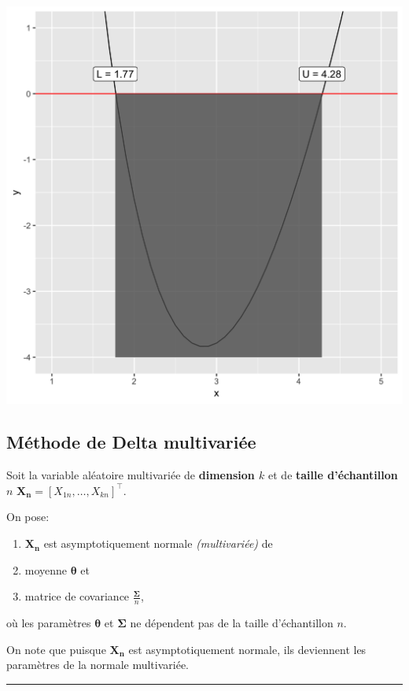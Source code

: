 \documentclass[10pt, french]{article}
\begin{document}
\begin{multicols*}{3}
\begin{center}
	\includegraphics[scale = 0.07]{src/Q13-57_visualisation.png}
\end{center}

\subsection*{Méthode de Delta multivariée}
\begin{definitionNOHFILL}
Soit la variable aléatoire multivariée de \textbf{dimension $k$} et de \textbf{taille d'échantillon $n$} $\bm{X_{n}} = [X_{1n}, \dots, X_{kn}]^{\top}$.

On pose:
\begin{enumerate}
	\item	$\bm{X_{n}}$ est asymptotiquement normale \textit{(multivariée)} de 
	\item	moyenne $\bm\theta$ et
	\item	matrice de covariance $\frac{\bm\Sigma}{n}$,
\end{enumerate}
où les paramètres $\bm\theta$ et $\bm\Sigma$ ne dépendent pas de la taille d'échantillon $n$. 

On note que puisque $\bm{X_{n}}$ est asymptotiquement normale, ils deviennent les paramètres de la normale multivariée.
\\
\hrule\hrulefill


\end{definitionNOHFILL}
\end{multicols*}
\end{document}

